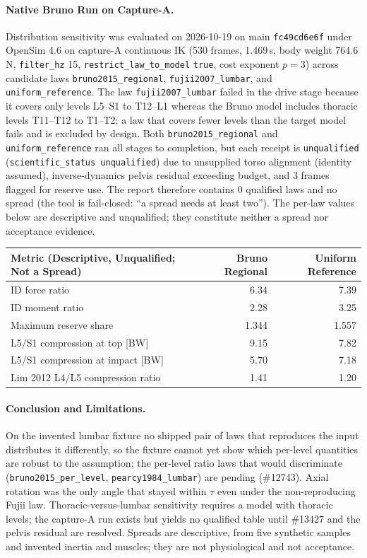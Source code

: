\paragraph{Native Bruno Run on Capture-A.}
Distribution sensitivity was evaluated on 2026-10-19 on main \texttt{fc49cd6e6f}
under OpenSim 4.6 on capture-A continuous IK (530 frames, 1.469\,s, body weight
764.6\,N, \texttt{filter\_hz} 15, \texttt{restrict\_law\_to\_model} \texttt{true},
cost exponent $p=3$) across candidate laws \texttt{bruno2015\_regional},
\texttt{fujii2007\_lumbar}, and \texttt{uniform\_reference}. The law
\texttt{fujii2007\_lumbar} failed in the drive stage because it covers only
levels L5--S1 to T12--L1 whereas the Bruno model includes thoracic levels
T11--T12 to T1--T2; a law that covers fewer levels than the target model fails
and is excluded by design. Both \texttt{bruno2015\_regional} and
\texttt{uniform\_reference} ran all stages to completion, but each receipt is
\texttt{unqualified} (\texttt{scientific\_status unqualified}) due to unsupplied
torso alignment (identity assumed), inverse-dynamics pelvis residual exceeding
budget, and 3 frames flagged for reserve use. The report therefore contains 0
qualified laws and no spread (the tool is fail-closed: ``a spread needs at least
two''). The per-law values below are descriptive and unqualified; they constitute
neither a spread nor acceptance evidence.

\begin{center}
\begin{tabular}{lrr}
\hline
Metric (Descriptive, Unqualified; Not a Spread) & Bruno Regional & Uniform Reference \\
\hline
ID force ratio & 6.34 & 7.39 \\
ID moment ratio & 2.28 & 3.25 \\
Maximum reserve share & 1.344 & 1.557 \\
L5/S1 compression at top [BW] & 9.15 & 7.82 \\
L5/S1 compression at impact [BW] & 5.70 & 7.18 \\
Lim 2012 L4/L5 compression ratio & 1.41 & 1.20 \\
\hline
\end{tabular}
\end{center}

\paragraph{Conclusion and Limitations.}
On the invented lumbar fixture no shipped pair of laws that reproduces the
input distributes it differently, so the fixture cannot yet show which
per-level quantities are robust to the assumption; the per-level ratio laws
that would discriminate (\texttt{bruno2015\_per\_level},
\texttt{pearcy1984\_lumbar}) are pending (\#12743). Axial rotation was the only
angle that stayed within $\tau$ even under the non-reproducing Fujii law.
Thoracic-versus-lumbar sensitivity requires a model with thoracic levels; the
capture-A run exists but yields no qualified table until \#13427 and the pelvis
residual are resolved. Spreads are descriptive, from five synthetic samples and
invented inertia and muscles; they are not physiological and not acceptance.

